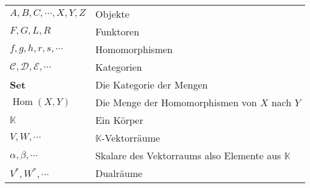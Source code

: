 \documentclass[a4paper]{amsart}
\theoremstyle{definition}
\DeclareMathOperator{\Hom}{Hom}
\newcommand{\K}{\ensuremath{\mathbb{ K }}}
\begin{document}
\renewcommand*{\arraystretch}{1}

\begin{tabular}{ll}
    $A, B, C, \cdots, X, Y, Z$          & Objekte\\
    $F,G,L,R$ & Funktoren\\
    $f, g, h, r, s, \cdots$   & Homomorphismen\\
    $\mathcal C, \mathcal D, \mathcal E, \cdots$ & Kategorien\\
    \textbf{Set} & Die Kategorie der Mengen\\
    $\Hom( X, Y)$ & Die Menge der Homomorphismen von $X$ nach $Y$\\
    $\K$         &Ein Körper\\
    $V, W, \cdots$ &$\K$-Vektorräume\\
    $\alpha, \beta, \cdots$ & Skalare des Vektorraums also Elemente aus $\K$\\
    $V^*, W^*, \cdots$ & Dualräume
\end{tabular}
\end{document}

